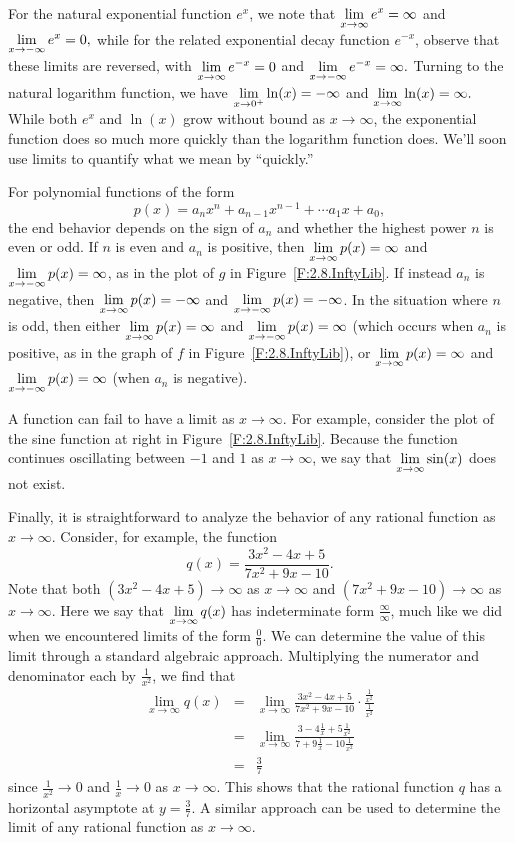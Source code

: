 For the natural exponential function $e^x$, we note that $\displaystyle\lim_{x \to \infty} e^x = \infty$ and $\displaystyle \lim_{x \to -\infty} e^x = 0,$ while for the related exponential decay function $e^{-x}$, observe that these limits are reversed, with \newline $\displaystyle \lim_{x \to \infty} e^{-x} = 0$ and $\displaystyle \lim_{x \to -\infty} e^{-x} = \infty.$  Turning to the natural logarithm function, we have $\displaystyle \lim_{x \to 0^+} \ln(x) = -\infty$ and $\displaystyle \lim_{x \to \infty} \ln(x) = \infty.$  While both $e^x$ and $\ln(x)$ grow without bound as $x \to \infty$, the exponential function does so much more quickly than the logarithm function does.  We'll soon use limits to quantify what we mean by ``quickly.''

For polynomial functions of the form $$p(x) = a_n x^n + a_{n-1}x^{n-1} + \cdots a_1 x + a_0,$$ the end behavior depends on the sign of $a_n$ and whether the highest power $n$ is even or odd.  If $n$ is even and $a_n$ is positive, then $\displaystyle\lim_{x \to \infty} p(x) = \infty$ and $\displaystyle\lim_{x \to -\infty} p(x) = \infty$, as in the plot of $g$ in Figure~\ref{F:2.8.InftyLib}.  If instead $a_n$ is negative, then $\displaystyle\lim_{x \to \infty} p(x) = -\infty$ and $\displaystyle\lim_{x \to -\infty} p(x) = -\infty$.  In the situation where $n$ is odd, then either $\displaystyle\lim_{x \to \infty} p(x) = \infty$ and $\displaystyle\lim_{x \to -\infty} p(x) = \infty$ (which occurs when $a_n$ is positive, as in the graph of $f$ in Figure~\ref{F:2.8.InftyLib}), or $\displaystyle\lim_{x \to \infty} p(x) = \infty$ and $\displaystyle\lim_{x \to -\infty} p(x) = \infty$ (when $a_n$ is negative).

A function can fail to have a limit as $x \to \infty$.  For example, consider the plot of the sine function at right in Figure~\ref{F:2.8.InftyLib}.  Because the function continues oscillating between $-1$ and $1$ as $x \to \infty$, we say that $\displaystyle\lim_{x \to \infty} \sin(x)$ does not exist.

Finally, it is straightforward to analyze the behavior of any rational function as $x \to \infty$.  Consider, for example, the function 
$$q(x) =  \frac{3x^2 - 4x + 5}{7x^2 + 9x - 10}.$$
Note that both $(3x^2 - 4x + 5) \to \infty$ as $x \to \infty$ and $(7x^2 + 9x - 10) \to \infty$ as $x \to \infty$.  Here we say that $\displaystyle\lim_{x \to \infty} q(x)$ has indeterminate form $\frac{\infty}{\infty}$, much like we did when we encountered limits of the form $\frac{0}{0}$.  We can determine the value of this limit through a standard algebraic approach.  Multiplying the numerator and denominator each by $\frac{1}{x^2}$, we find that
\begin{eqnarray*}
\lim_{x \to \infty} q(x) & = & \lim_{x \to \infty} \frac{3x^2 - 4x + 5}{7x^2 + 9x - 10} \cdot \frac{\frac{1}{x^2}}{\frac{1}{x^2}} \\
& = & \lim_{x \to \infty} \frac{3 - 4\frac{1}{x} + 5\frac{1}{x^2}}{7 + 9\frac{1}{x} - 10\frac{1}{x^2}} \\
& = & \frac{3}{7}
\end{eqnarray*}
since $\frac{1}{x^2} \to 0$ and $\frac{1}{x} \to 0$ as $x \to \infty$.  This shows that the rational function $q$ has a horizontal asymptote at $y = \frac{3}{7}$.  A similar approach can be used to determine the limit of any rational function as $x \to \infty$.

